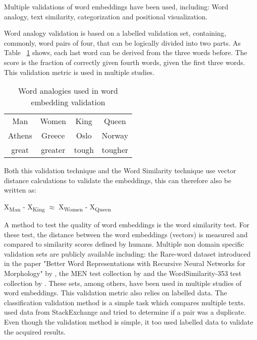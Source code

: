 \documentclass[../../Thesis.tex]{subfiles}
\begin{document}
\newpage
{}
Multiple validations of word embeddings have been used, including: Word analogy, text similarity, categorization and positional visualization.
\begin{jumpin}
Word analogy validation is based on a labelled validation set, containing, commonly, word pairs of four, that can be logically divided into two parts. As  Table
~\ref{table:wordAnalogies} shows, each last word can be derived from the three words before. The score is the fraction of correctly given fourth words, given the first three words. This validation metric is used in multiple studies\cite{mikolov2013distributed, mikolov2013efficient, dai2015document, pennington2014glove}.
\begin{table}
\begin{center}
\begin{tabular}{c c c c}
Man & Women & King & Queen \\
Athens & Greece & Oslo & Norway\\
great & greater & tough & tougher
\end{tabular}
\end{center}
\caption{Word analogies used in word embedding validation}\label{table:wordAnalogies}
\end{table}
Both this validation technique and the Word Similarity technique use vector distance calculations to validate the embeddings, this can therefore also be written as:
\begin{displayquote}
	X\textsubscript{Man} - X\textsubscript{King} $\approx$  X\textsubscript{Women} - X\textsubscript{Queen}
\end{displayquote}
A method to test the quality of word embeddings is the word similarity test. For these test, the distance between the word embeddings (vectors) is measured and compared to similarity scores defined by humans. Multiple non domain specific validation sets are publicly available including: the Rare-word dataset introduced in the paper "Better Word Representations with Recursive Neural Networks for Morphology" by \citet{luong2013better}, 
the MEN test collection by \citet{EBruniMENCollection} and the WordSimilarity-353 test collection by \citet{EGabrilovichWScollection}.
These sets, among others, have been used in multiple studies of word embeddings\cite{pennington2014glove, mikolov2013efficient}. This validation metric also relies on labelled data.
The classification validation method is a simple task which compares multiple texts. \citet{lau2016empirical} used data from StackExchange and tried to determine if a pair was a duplicate. Even though the validation method is simple, it too used labelled data to validate the acquired results.

\end{jumpin}
\end{document}
